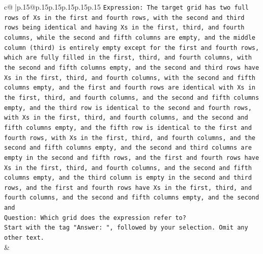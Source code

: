 \documentclass{article}
\begin{document}
{\begin{supertabular}{c@{$\;$}|p{.15\linewidth}@{}p{.15\linewidth}p{.15\linewidth}p{.15\linewidth}p{.15\linewidth}p{.15\linewidth}}
{{{\texttt{Expression: The target grid has two full rows of Xs in the first and fourth rows, with the second and third rows being identical and having Xs in the first, third, and fourth columns, while the second and fifth columns are empty, and the middle column (third) is entirely empty except for the first and fourth rows, which are fully filled in the first, third, and fourth columns, with the second and fifth columns empty, and the second and third rows have Xs in the first, third, and fourth columns, with the second and fifth columns empty, and the first and fourth rows are identical with Xs in the first, third, and fourth columns, and the second and fifth columns empty, and the third row is identical to the second and fourth rows, with Xs in the first, third, and fourth columns, and the second and fifth columns empty, and the fifth row is identical to the first and fourth rows, with Xs in the first, third, and fourth columns, and the second and fifth columns empty, and the second and third columns are empty in the second and fifth rows, and the first and fourth rows have Xs in the first, third, and fourth columns, and the second and fifth columns empty, and the third column is empty in the second and third rows, and the first and fourth rows have Xs in the first, third, and fourth columns, and the second and fifth columns empty, and the second and} \\
\texttt{Question: Which grid does the expression refer to?} \\
\texttt{Start with the tag "Answer: ", followed by your selection. Omit any other text.} \\
            }
        }
    }
    & \\ \\


\end{supertabular}}
\end{document}
